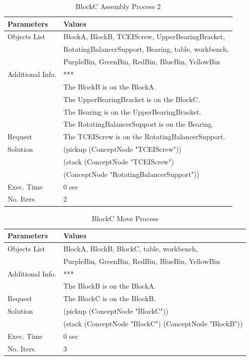 \begin{table}[htbp]
  \centering
  \caption{BlockC Assembly Process 2}\label{tab:ass_C_2}
  \medskip
\begin{tabular}{ll}
\toprule
\textbf{Parameters} &  \textbf{Values}  \\
\midrule
\rowcolor{gray!25}
Objects List &  BlockA, BlockB, TCEIScrew, UpperBearingBracket, \\
\rowcolor{gray!25}
& RotatingBalancerSupport, Bearing, table, workbench, \\
\rowcolor{gray!25}
&  PurpleBin, GreenBin, RedBin, BlueBin, YellowBin \\
Additional Info. & *** \\
& The BlockB is on the BlockA. \\
& The UpperBearingBracket is on the BlockC. \\
& The Bearing is on the UpperBearingBracket. \\
& The RotatingBalancerSupport is on the Bearing. \\
\rowcolor{gray!25}
Request & The TCEIScrew is on the RotatingBalancerSupport. \\
Solution & (pickup (ConceptNode "TCEIScrew")) \\
& (stack (ConceptNode "TCEIScrew") \\
& \quad\quad\quad(ConceptNode "RotatingBalancerSupport")) \\
\rowcolor{gray!25}
Exec. Time & 0 sec \\
No. Iters. & 2 \\	
\bottomrule
\end{tabular}
\end{table}

\begin{table}[htbp]
  \centering
  \caption{BlockC Move Process}\label{tab:ass_C_3}
  \medskip
\begin{tabular}{ll}
\toprule
\textbf{Parameters} &  \textbf{Values}  \\
\midrule
\rowcolor{gray!25}
Objects List &  BlockA, BlockB, BlockC, table, workbench, \\
\rowcolor{gray!25}
&  PurpleBin, GreenBin, RedBin, BlueBin, YellowBin \\
Additional Info. & *** \\
& The BlockB is on the BlockA. \\
\rowcolor{gray!25}
Request & The BlockC is on the BlockB. \\
Solution & (pickup (ConceptNode "BlockC")) \\
& (stack (ConceptNode "BlockC") (ConceptNode "BlockB")) \\
\rowcolor{gray!25}
Exec. Time & 0 sec \\
No. Iters. & 3 \\	
\bottomrule
\end{tabular}
\end{table}

